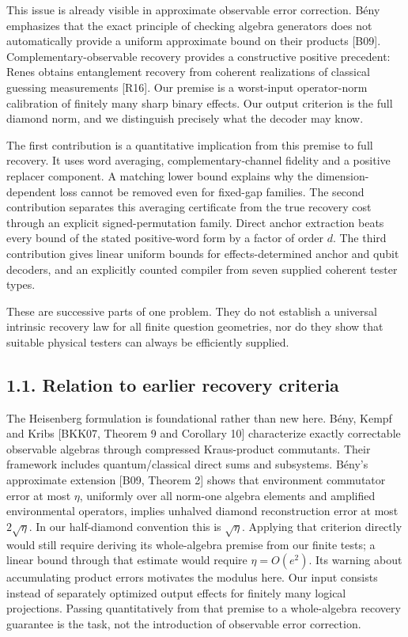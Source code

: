 \documentclass[11pt]{article}
\begin{document}
This issue is already visible in approximate observable error correction.
Bény emphasizes that the exact principle of checking algebra generators does
not automatically provide a uniform approximate bound on their products
[B09]. Complementary-observable recovery provides a constructive positive
precedent: Renes obtains entanglement recovery from coherent realizations of
classical guessing measurements [R16]. Our premise is a worst-input
operator-norm calibration of finitely many sharp binary effects. Our output
criterion is the full diamond norm, and we distinguish precisely what the
decoder may know.

The first contribution is a quantitative implication from this premise to
full recovery. It uses word averaging, complementary-channel fidelity and a
positive replacer component. A matching lower bound explains why the
dimension-dependent loss cannot be removed even for fixed-gap families.
The second contribution separates this averaging certificate from the true
recovery cost through an explicit signed-permutation family. Direct anchor
extraction beats every bound of the stated positive-word form by a factor
of order \(d\). The third contribution gives linear uniform bounds for
effects-determined anchor and qubit decoders, and an explicitly counted
compiler from seven supplied coherent tester types.

These are successive parts of one problem. They do not establish a universal
intrinsic recovery law for all finite question geometries, nor do they show
that suitable physical testers can always be efficiently supplied.

\subsection*{1.1. Relation to earlier recovery criteria}

The Heisenberg formulation is foundational rather than new here.
Bény, Kempf and Kribs [BKK07, Theorem 9 and Corollary 10] characterize
exactly correctable observable algebras through compressed Kraus-product
commutants. Their framework includes quantum/classical direct sums and
subsystems. Bény's approximate extension [B09, Theorem 2] shows that
environment commutator error at most \(\eta\), uniformly over all norm-one
algebra elements and amplified environmental operators, implies unhalved
diamond reconstruction error at most \(2\sqrt\eta\). In our half-diamond
convention this is \(\sqrt\eta\). Applying that criterion directly would
still require deriving its whole-algebra premise from our finite tests;
a linear bound through that estimate would require \(\eta=O(e^2)\).
Its warning about accumulating product errors motivates the modulus here.
Our input consists instead of separately optimized output effects for finitely
many logical projections. Passing quantitatively from that premise to a
whole-algebra recovery guarantee is the task, not the introduction of
observable error correction.
\end{document}
